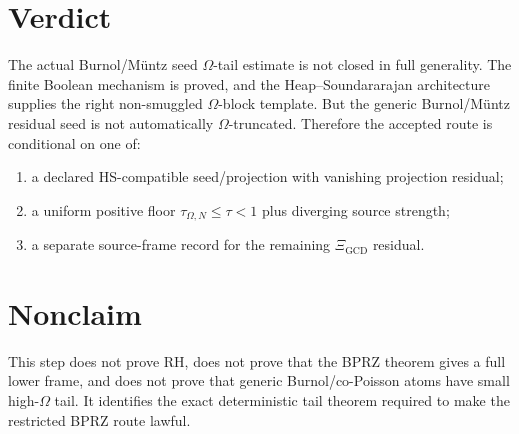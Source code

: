 \documentclass[11pt]{article}
\newcommand{\Om}{\Omega}
\begin{document}
\section{Verdict}
The actual Burnol/M\"untz seed $\Omega$-tail estimate is not closed in full generality.  The finite Boolean mechanism is proved, and the Heap--Soundararajan architecture supplies the right non-smuggled $\Omega$-block template.  But the generic Burnol/M\"untz residual seed is not automatically $\Omega$-truncated.  Therefore the accepted route is conditional on one of:
\begin{enumerate}
\item a declared HS-compatible seed/projection with vanishing projection residual;
\item a uniform positive floor $\tau_{\Om,N}\le\tau<1$ plus diverging source strength;
\item a separate source-frame record for the remaining $\Xi_{\mathrm{GCD}}$ residual.
\end{enumerate}

\section{Nonclaim}
This step does not prove RH, does not prove that the BPRZ theorem gives a full lower frame, and does not prove that generic Burnol/co-Poisson atoms have small high-$\Omega$ tail.  It identifies the exact deterministic tail theorem required to make the restricted BPRZ route lawful.
\end{document}

